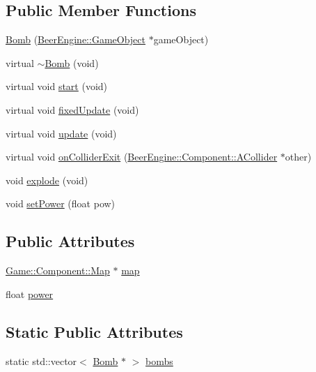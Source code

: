 \subsection*{Public Member Functions}
\begin{DoxyCompactItemize}
\item 
\mbox{\hyperlink{class_game_1_1_component_1_1_bomb_aed38ca47ddf849382948b02485be41f8}{Bomb}} (\mbox{\hyperlink{class_beer_engine_1_1_game_object}{Beer\+Engine\+::\+Game\+Object}} $\ast$game\+Object)
\item 
virtual \mbox{\hyperlink{class_game_1_1_component_1_1_bomb_a08d967ddfb90d063b71270ce6d087c2f}{$\sim$\+Bomb}} (void)
\item 
virtual void \mbox{\hyperlink{class_game_1_1_component_1_1_bomb_a74e5f8e628a9d434f0faf91273f33990}{start}} (void)
\item 
virtual void \mbox{\hyperlink{class_game_1_1_component_1_1_bomb_af6598c095c2f36a2a1b1048eb84d6fc7}{fixed\+Update}} (void)
\item 
virtual void \mbox{\hyperlink{class_game_1_1_component_1_1_bomb_a6685384996c92b8d3f0955c2f6a335b5}{update}} (void)
\item 
virtual void \mbox{\hyperlink{class_game_1_1_component_1_1_bomb_a73e1089e8b6be42c0357beda3ab6ccfa}{on\+Collider\+Exit}} (\mbox{\hyperlink{class_beer_engine_1_1_component_1_1_a_collider}{Beer\+Engine\+::\+Component\+::\+A\+Collider}} $\ast$other)
\item 
void \mbox{\hyperlink{class_game_1_1_component_1_1_bomb_aac712a604337a08ce89f88782cae5df9}{explode}} (void)
\item 
void \mbox{\hyperlink{class_game_1_1_component_1_1_bomb_a3432430350d557ef1b7d9ac0339b659a}{set\+Power}} (float pow)
\end{DoxyCompactItemize}
\subsection*{Public Attributes}
\begin{DoxyCompactItemize}
\item 
\mbox{\hyperlink{class_game_1_1_component_1_1_map}{Game\+::\+Component\+::\+Map}} $\ast$ \mbox{\hyperlink{class_game_1_1_component_1_1_bomb_af6be11b39be1333d5bbd64b059bc2b33}{map}}
\item 
float \mbox{\hyperlink{class_game_1_1_component_1_1_bomb_a0e4068ea1fe8146c412c76f472db7087}{power}}
\end{DoxyCompactItemize}
\subsection*{Static Public Attributes}
\begin{DoxyCompactItemize}
\item 
static std\+::vector$<$ \mbox{\hyperlink{class_game_1_1_component_1_1_bomb}{Bomb}} $\ast$ $>$ \mbox{\hyperlink{class_game_1_1_component_1_1_bomb_a9dc5871647b57df886487e2d936b4dcc}{bombs}}
\end{DoxyCompactItemize}
